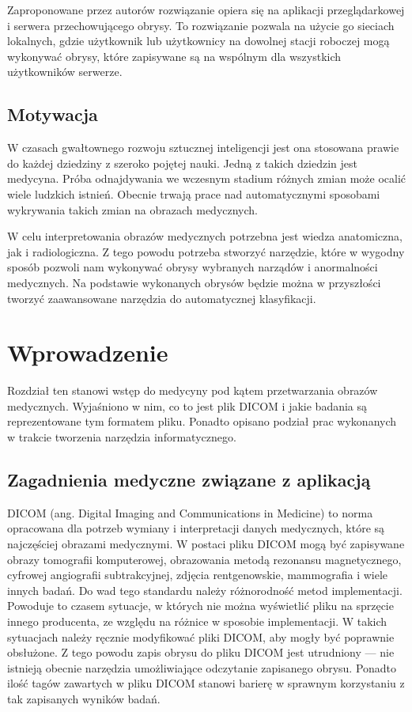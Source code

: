 \documentclass[a4paper,11pt,twoside,openright]{report}
\theoremstyle{definition}
\begin{document}
Zaproponowane przez autorów rozwiązanie opiera się na aplikacji przeglądarkowej
i serwera przechowującego obrysy. To rozwiązanie pozwala na użycie go sieciach
lokalnych, gdzie użytkownik lub użytkownicy na dowolnej stacji roboczej mogą
wykonywać obrysy, które zapisywane są na wspólnym dla wszystkich użytkowników serwerze.

\section*{Motywacja}

W czasach gwałtownego rozwoju sztucznej inteligencji jest ona stosowana prawie
do każdej dziedziny z szeroko pojętej nauki. Jedną z takich dziedzin jest medycyna.
Próba odnajdywania we wczesnym stadium różnych zmian może ocalić
wiele ludzkich istnień. Obecnie trwają prace nad automatycznymi
sposobami wykrywania takich zmian na obrazach medycznych.

W celu interpretowania obrazów medycznych potrzebna jest wiedza anatomiczna, jak
i radiologiczna. Z tego powodu potrzeba stworzyć narzędzie, które w wygodny sposób
pozwoli nam wykonywać obrysy wybranych narządów i anormalności medycznych. Na
podstawie wykonanych obrysów będzie można w przyszłości tworzyć zaawansowane
narzędzia do automatycznej klasyfikacji.

\chapter {Wprowadzenie}

Rozdział ten stanowi wstęp do medycyny pod kątem przetwarzania obrazów medycznych.
Wyjaśniono w nim, co to jest plik DICOM i jakie badania są reprezentowane tym
formatem pliku. Ponadto opisano podział prac wykonanych w trakcie tworzenia
narzędzia informatycznego.

\section {Zagadnienia medyczne związane z aplikacją}

DICOM (ang. Digital Imaging and Communications in Medicine) \cite{DICOM} to norma
opracowana dla potrzeb wymiany i interpretacji danych medycznych, które są
najczęściej obrazami medycznymi. W postaci pliku DICOM mogą być zapisywane obrazy
tomografii komputerowej, obrazowania metodą rezonansu magnetycznego, cyfrowej
angiografii subtrakcyjnej, zdjęcia rentgenowskie, mammografia i wiele innych badań.
Do wad tego standardu należy różnorodność metod implementacji. Powoduje to czasem
sytuacje, w których nie można wyświetlić pliku na sprzęcie innego producenta, ze
względu na różnice w sposobie implementacji. W takich sytuacjach należy ręcznie
modyfikować pliki DICOM, aby mogły być poprawnie obsłużone. Z tego powodu zapis
obrysu do pliku DICOM jest utrudniony --- nie istnieją obecnie narzędzia
umożliwiające odczytanie zapisanego obrysu. Ponadto ilość tagów zawartych w pliku
DICOM stanowi barierę w sprawnym korzystaniu z tak zapisanych wyników badań.
\end{document}
